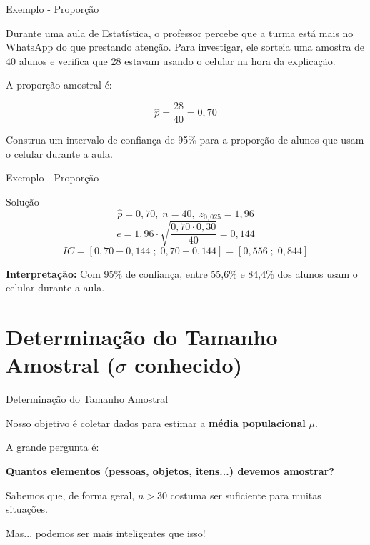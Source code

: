 \documentclass[14pt,aspectratio=1610]{beamer}
\begin{document}
	\begin{frame}{Exemplo - Proporção}
		\begin{block}{}
			\justifying
			Durante uma aula de Estatística, o professor percebe que a turma está mais no WhatsApp do que prestando atenção. Para investigar, ele sorteia uma amostra de 40 alunos e verifica que 28 estavam usando o celular na hora da explicação.
			
			A proporção amostral é:
			
			\[
			\hat{p} = \frac{28}{40} = 0,70
			\]
			
			Construa um intervalo de confiança de 95\% para a proporção de alunos que usam o celular durante a aula.
		\end{block}
		
	\end{frame}
	
	\begin{frame}{Exemplo - Proporção}
		
		\begin{block}{Solução}
			\[
			\hat{p} = 0,70, \; n = 40, \; z_{0,025} = 1,96
			\]
			\[
			e = 1,96 \cdot \sqrt{\frac{0,70 \cdot 0,30}{40}} = 0,144
			\]
			\[
			IC = [0,70 - 0,144 \; ; \; 0,70 + 0,144] = [0,556 \; ; \; 0,844]
			\]
			
			\textbf{Interpretação:} Com 95\% de confiança, entre 55,6\% e 84,4\% dos alunos usam o celular durante a aula.
		\end{block}
	\end{frame}
	
	\section{Determinação do Tamanho Amostral ($\sigma$ conhecido)}
	
	\begin{frame}{Determinação do Tamanho Amostral}
		\begin{block}{}
			\justifying
			Nosso objetivo é coletar dados para estimar a \textbf{média populacional} $\mu$.
			
			A grande pergunta é:
			
			\begin{center}
				\textbf{Quantos elementos (pessoas, objetos, itens...) devemos amostrar?}
			\end{center}
			
			Sabemos que, de forma geral, $n > 30$ costuma ser suficiente para muitas situações.
			
			Mas... podemos ser mais inteligentes que isso! 
			
		\end{block}
	\end{frame}
	
\end{document}

